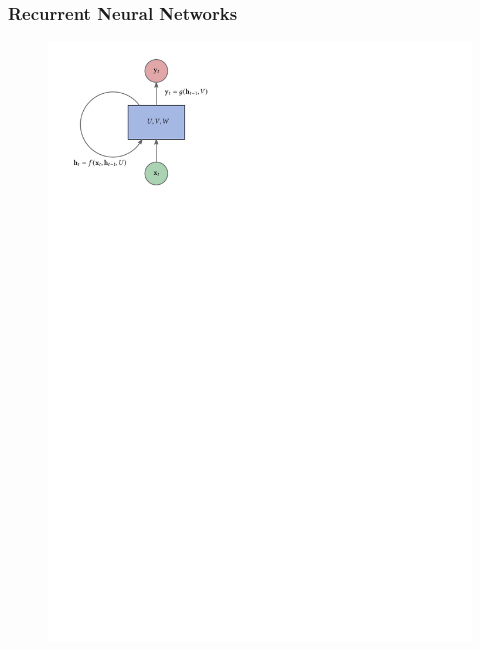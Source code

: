 \documentclass[aspectratio=169]{beamer}
\begin{document}
\begin{frame}
	\frametitle{Recurrent Neural Networks}
	\begin{figure}
		\includegraphics[scale=0.9]{rnn-diagram.pdf}
	\end{figure}
\end{frame}
\end{document}
